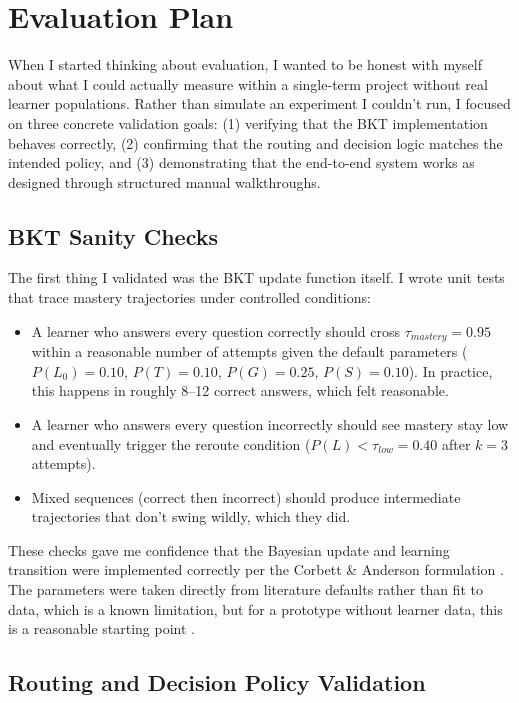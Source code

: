 \documentclass{article}
\begin{document}
\FloatBarrier

\section{Evaluation Plan}

When I started thinking about evaluation, I wanted to be honest with myself about what I could actually measure within a single-term project without real learner populations. Rather than simulate an experiment I couldn't run, I focused on three concrete validation goals: (1) verifying that the BKT implementation behaves correctly, (2) confirming that the routing and decision logic matches the intended policy, and (3) demonstrating that the end-to-end system works as designed through structured manual walkthroughs.

\subsection{BKT Sanity Checks}

The first thing I validated was the BKT update function itself. I wrote unit tests that trace mastery trajectories under controlled conditions:

\begin{itemize}
    \item A learner who answers every question correctly should cross $\tau_{mastery} = 0.95$ within a reasonable number of attempts given the default parameters ($P(L_0) = 0.10$, $P(T) = 0.10$, $P(G) = 0.25$, $P(S) = 0.10$). In practice, this happens in roughly 8--12 correct answers, which felt reasonable.
    \item A learner who answers every question incorrectly should see mastery stay low and eventually trigger the reroute condition ($P(L) < \tau_{low} = 0.40$ after $k = 3$ attempts).
    \item Mixed sequences (correct then incorrect) should produce intermediate trajectories that don't swing wildly, which they did.
\end{itemize}

These checks gave me confidence that the Bayesian update and learning transition were implemented correctly per the Corbett \& Anderson formulation \cite{corbett1995}. The parameters were taken directly from literature defaults rather than fit to data, which is a known limitation, but for a prototype without learner data, this is a reasonable starting point \cite{vandesande2013}.

\subsection{Routing and Decision Policy Validation}
\end{document}
